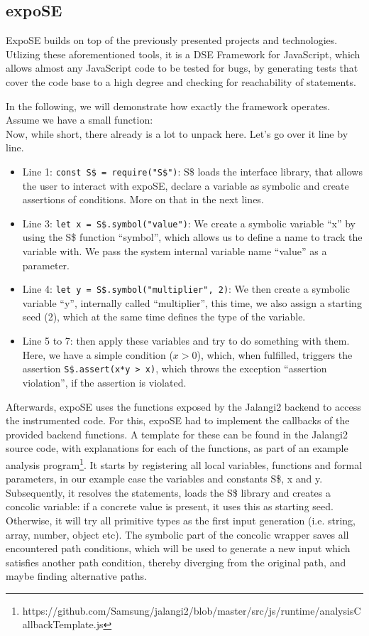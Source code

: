 \subsection{expoSE}
\label{sec:expose}
ExpoSE builds on top of the previously presented projects and technologies. Utlizing these aforementioned tools, it is a DSE Framework for JavaScript, which allows almost any JavaScript code to be tested for bugs, by generating tests that cover the code base to a high degree and checking for reachability of statements. \cite{loring_expose_2017}

In the following, we will demonstrate how exactly the framework operates. \\
Assume we have a small function:\\
Now, while short, there already is a lot to unpack here. Let's go over it line by line. 
\begin{itemize}
    \item Line 1: \lstinline{const S$ = require("S$")}: S\$ loads the interface library, that allows the user to interact with expoSE, declare a variable as symbolic and create assertions of conditions. More on that in the next lines.
    \item Line 3: \lstinline{let x = S$.symbol("value")}: We create a symbolic variable “x” by using the S\$ function “symbol”, which allows us to define a name to track the variable with. We pass the system internal variable name “value” as a parameter.  
    \item Line 4: \lstinline{let y = S$.symbol("multiplier", 2)}: We then create a symbolic variable “y”, internally called “multiplier”, this time, we also assign a starting seed (2), which at the same time defines the type of the variable.
    \item Line 5 to 7: then apply these variables and try to do something with them. Here, we have a simple condition ($x > 0$), which, when fulfilled, triggers the assertion \lstinline{S$.assert(x*y > x)}, which throws the exception “assertion violation”, if  the assertion is violated.
\end{itemize}
Afterwards, expoSE uses the functions exposed by the Jalangi2 backend  to access the instrumented code. For this, expoSE had to implement the callbacks of the provided backend functions. A template for these can be found in the Jalangi2 source code, with explanations for each of the functions, as part of an example analysis program\footnote{https://github.com/Samsung/jalangi2/blob/master/src/js/runtime/analysisCallbackTemplate.js}. 
It starts by registering all local variables, functions and formal parameters, in our example case the variables and constants S\$, x and y. Subsequently, it resolves the statements, loads the S\$ library and creates a concolic variable: if a concrete value is present, it uses this as starting seed. Otherwise, it will try all primitive types as the first input generation (i.e. string, array, number, object etc). The symbolic part of the concolic wrapper saves all encountered path conditions, which will be used to generate a new input which satisfies another path condition, thereby diverging from the original path, and maybe finding alternative paths.

